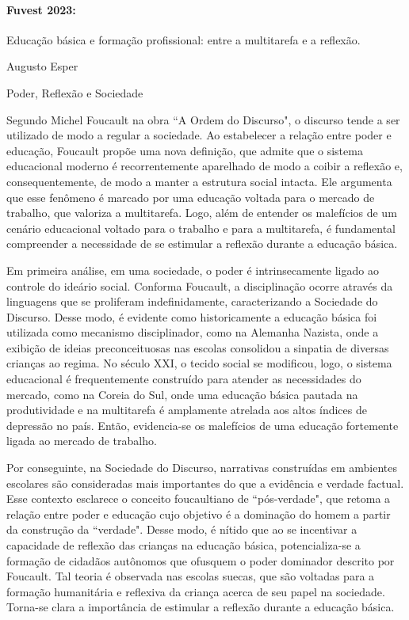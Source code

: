 \documentclass{article}
\begin{document}
\newpage
\paragraph{ Fuvest 2023:}Educação básica e formação profissional: entre a multitarefa e a reflexão.

\begin{flushright} Augusto Esper  \end{flushright}

Poder, Reflexão e Sociedade 

Segundo Michel Foucault na obra “A Ordem do Discurso", o discurso tende a ser utilizado de modo a regular a sociedade. Ao estabelecer a relação entre poder e educação, Foucault propõe uma nova definição, que admite que o sistema educacional moderno é recorrentemente aparelhado de modo a coibir a reflexão e, consequentemente, de modo a manter a estrutura social intacta. Ele argumenta que esse fenômeno é marcado por uma educação voltada para o mercado de trabalho, que valoriza a multitarefa. Logo, além de entender os malefícios de um cenário educacional voltado para o trabalho e para a multitarefa, é fundamental compreender a necessidade de se estimular a reflexão durante a educação básica.

Em primeira análise, em uma sociedade, o poder é intrinsecamente ligado ao controle do ideário social. Conforma Foucault, a disciplinação ocorre através da linguagens que se proliferam indefinidamente, caracterizando a Sociedade do Discurso.  Desse modo, é evidente como historicamente a educação básica foi utilizada como mecanismo disciplinador, como na Alemanha Nazista, onde a exibição de ideias preconceituosas nas escolas consolidou a sinpatia de diversas crianças ao regima. No século XXI, o tecido social se modificou, logo, o sistema educacional é frequentemente construído para atender as necessidades do mercado, como na Coreia do Sul, onde uma educação básica pautada na produtividade e na multitarefa é amplamente atrelada aos altos índices de depressão no país. Então, evidencia-se os malefícios de uma educação fortemente ligada ao mercado de trabalho.

Por conseguinte, na Sociedade do Discurso, narrativas construídas em ambientes escolares são consideradas mais importantes do que a evidência e verdade factual. Esse contexto esclarece o conceito foucaultiano de “pós-verdade", que retoma a relação entre poder e educação cujo objetivo é a dominação do homem a partir da construção da “verdade". Desse modo, é nítido que ao se incentivar a capacidade de reflexão das crianças na educação básica, potencializa-se a formação de cidadãos autônomos que ofusquem o poder dominador descrito por Foucault. Tal teoria é observada nas escolas suecas, que são voltadas para a formação humanitária e reflexiva da criança acerca de seu papel na sociedade. Torna-se clara a importância  de estimular a reflexão durante a educação básica.
\end{document}

